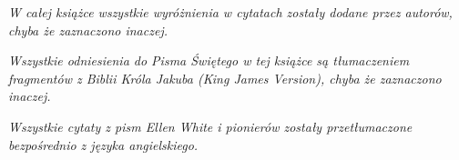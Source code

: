\thispagestyle{empty}

\vspace*{1cm}

\begin{center}
    \textit{W całej książce wszystkie wyróżnienia w cytatach zostały dodane przez autorów, chyba że zaznaczono inaczej.}
    
    \textit{Wszystkie odniesienia do Pisma Świętego w tej książce są tłumaczeniem fragmentów z Biblii Króla Jakuba (King James Version), chyba że zaznaczono inaczej.}

    \textit{Wszystkie cytaty z pism Ellen White i pionierów zostały przetłumaczone bezpośrednio z języka angielskiego.}
\end{center}

\cleardoublepage